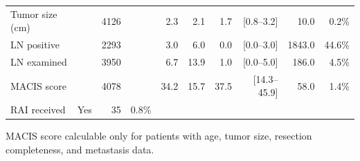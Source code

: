 \begin{table}[htbp]
\begin{tabular}{lrrrrrrrrr}
Tumor size (cm) &  & 4126 &  & 2.3 & 2.1 & 1.7 & [0.8--3.2] & 10.0 & 0.2\% \\
LN positive &  & 2293 &  & 3.0 & 6.0 & 0.0 & [0.0--3.0] & 1843.0 & 44.6\% \\
LN examined &  & 3950 &  & 6.7 & 13.9 & 1.0 & [0.0--5.0] & 186.0 & 4.5\% \\
MACIS score &  & 4078 &  & 34.2 & 15.7 & 37.5 & [14.3--45.9] & 58.0 & 1.4\% \\
RAI received & Yes & 35 & 0.8\% &  &  &  &  &  &  \\
\bottomrule
\end{tabular}
\begin{tablenotes}\footnotesize
\item[1] MACIS score calculable only for patients with age, tumor size, resection completeness, and metastasis data.
\end{tablenotes}
\end{table}
